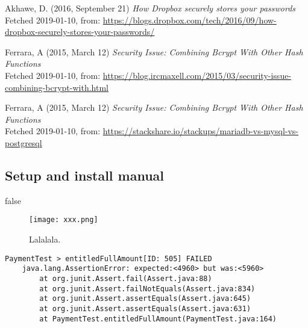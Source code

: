 \documentclass[12pt,a4paper]{report}
\begin{document}
{\begin{thebibliography}{1}
Akhawe, D. (2016, September 21) {\em How Dropbox securely stores your passwords} \\
Fetched 2019-01-10, from:
\url{https://blogs.dropbox.com/tech/2016/09/how-dropbox-securely-stores-your-passwords/}

Ferrara, A (2015, March 12) {\em Security Issue: Combining Bcrypt With Other Hash Functions} \\
Fetched 2019-01-10, from:
\url{https://blog.ircmaxell.com/2015/03/security-issue-combining-bcrypt-with.html}

Ferrara, A (2015, March 12) {\em Security Issue: Combining Bcrypt With Other Hash Functions} \\
Fetched 2019-01-10, from:
\url{https://stackshare.io/stackups/mariadb-vs-mysql-vs-postgresql}

\end{thebibliography}}

\begin{appendix}
\chapter{Setup and install manual}

\end{appendix}

\if false

\begin{figure}[H]
    \centering
    \texttt{[image: xxx.png]}
    \caption{Lalalala.}
    \label{fig:my_label}
\end{figure}

\begin{verbatim}
PaymentTest > entitledFullAmount[ID: 505] FAILED
    java.lang.AssertionError: expected:<4960> but was:<5960>
        at org.junit.Assert.fail(Assert.java:88)
        at org.junit.Assert.failNotEquals(Assert.java:834)
        at org.junit.Assert.assertEquals(Assert.java:645)
        at org.junit.Assert.assertEquals(Assert.java:631)
        at PaymentTest.entitledFullAmount(PaymentTest.java:164)
\end{verbatim}
\end{document}

